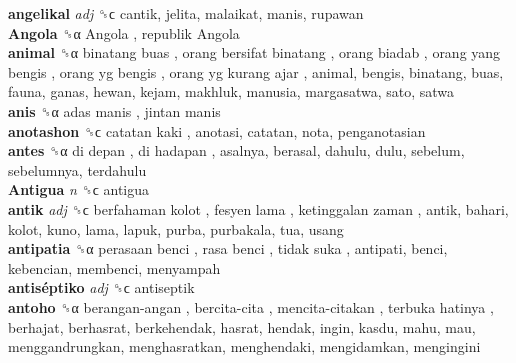 \textbf{angelikal} \emph{adj}  ␝ϲ  cantik, jelita, malaikat, manis, rupawan  \\
\textbf{Angola} ␝α   Angola ,  republik Angola   \\
\textbf{animal} ␝α   binatang buas ,  orang bersifat binatang ,  orang biadab ,  orang yang bengis ,  orang yg bengis ,  orang yg kurang ajar , animal, bengis, binatang, buas, fauna, ganas, hewan, kejam, makhluk, manusia, margasatwa, sato, satwa  \\
\textbf{anis} ␝α   adas manis ,  jintan manis   \\
\textbf{anotashon} ␝ϲ   catatan kaki , anotasi, catatan, nota, penganotasian  \\
\textbf{antes} ␝α   di depan ,  di hadapan , asalnya, berasal, dahulu, dulu, sebelum, sebelumnya, terdahulu  \\
\textbf{Antigua} \emph{n}  ␝ϲ  antigua  \\
\textbf{antik} \emph{adj}  ␝ϲ   berfahaman kolot ,  fesyen lama ,  ketinggalan zaman , antik, bahari, kolot, kuno, lama, lapuk, purba, purbakala, tua, usang  \\
\textbf{antipatia} ␝α   perasaan benci ,  rasa benci ,  tidak suka , antipati, benci, kebencian, membenci, menyampah  \\
\textbf{antiséptiko} \emph{adj}  ␝ϲ  antiseptik  \\
\textbf{antoho} ␝α   berangan-angan ,  bercita-cita ,  mencita-citakan ,  terbuka hatinya , berhajat, berhasrat, berkehendak, hasrat, hendak, ingin, kasdu, mahu, mau, menggandrungkan, menghasratkan, menghendaki, mengidamkan, mengingini  \\
